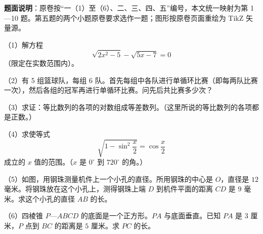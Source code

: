 

\begin{gktip}
\textbf{题面说明}：原卷按“一（1）至（6）、二、三、四、五”编号，本文统一映射为第 1—10 题。第五题的两个小题原卷要求选作一题；图形按原卷页面重绘为 TikZ 矢量源。
\end{gktip}


\begin{question}
（1）解方程
\nopagebreak[4]
\[
\sqrt{2x^2-5}-\sqrt{5x-7}=0
\]
（限定在实数范围内）。

\end{question}
\begin{question}
（2）有 5 组篮球队，每组 6 队。首先每组中各队进行单循环比赛（即每两队比赛一次），然后各组的冠军再进行单循环比赛。问先后共比赛多少次？

\end{question}
\begin{question}
（3）求证：等比数列的各项的对数组成等差数列。（这里所说的等比数列的各项都是正数。）

\end{question}
\begin{question}
（4）求使等式
\nopagebreak[4]
\[
\sqrt{1-\sin^2\frac{x}{2}}=\cos\frac{x}{2}
\]
成立的 $x$ 值的范围。（$x$ 是 $0^\circ$ 到 $720^\circ$ 的角。）

\Needspace{0.4\textheight}
\end{question}
\begin{question}
（5）如图，用钢珠测量机件上一个小孔的直径。所用钢珠的中心是 $O$，直径是 $12$ 毫米。将钢珠放在这个小孔上，测得钢珠上端 $D$ 到机件平面的距离 $CD$ 是 $9$ 毫米。求这个小孔的直径 $AB$ 的长。
\nopagebreak[4]
\begin{center}\end{center}
\nopagebreak[4]
\Needspace{0.4\textheight}
\end{question}
\begin{question}
（6）四棱锥 $P$—$ABCD$ 的底面是一个正方形。$PA$ 与底面垂直。已知 $PA$ 是 $3$ 厘米，$P$ 点到 $BC$ 的距离是 $5$ 厘米。求 $PC$ 的长。
\nopagebreak[4]
\begin{center}\end{center}
\nopagebreak[4]
\end{question}

